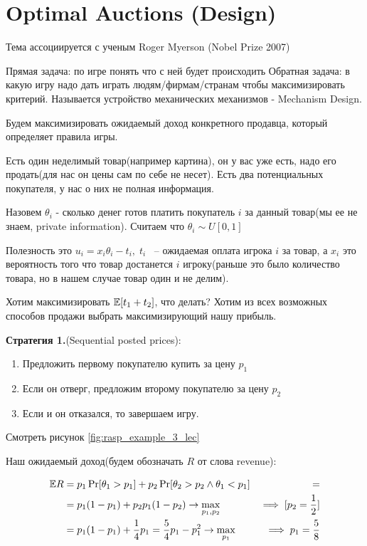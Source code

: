 
\section{Optimal Auctions (Design)}

Тема ассоциируется с ученым Roger Myerson (Nobel Prize 2007)

Прямая задача: по игре понять что с ней будет происходить
Обратная задача: в какую игру надо дать играть людям/фирмам/странам чтобы максимизировать критерий. Называется устройство механических механизмов - Mechanism Design.

Будем максимизировать ожидаемый доход конкретного продавца, который определяет правила игры.

\begin{exmpl}
	Есть один неделимый товар(например картина), он у вас уже есть, надо его продать(для нас он цены сам по себе не несет).
	Есть два потенциальных покупателя, у нас о них не полная информация.

	Назовем $\theta_i$ - сколько денег готов платить покупатель  $i$ за данный товар(мы ее не знаем, private information).
	Считаем что $\theta_i \sim U[0, 1]$

	Полезность это $u_i = x_i \theta_i - t_i, \; t_i$ ~-- ожидаемая оплата игрока $i$ за товар, а  $x_i$ это вероятность того что товар достанется  $i$ игроку(раньше это было количество товара, но в нашем случае товар один и не делим).

	Хотим максимизировать  $\mathbb E[t_1 + t_2]$, что делать? Хотим из всех возможных способов продажи выбрать максимизирующий нашу прибыль.

	\textbf{Стратегия 1.}(Sequential posted prices):
	\begin{enumerate}
		\item Предложить первому покупателю купить за цену $p_1$
		\item Если он отверг, предложим второму покупателю за цену $p_2$
		\item Если и он отказался, то завершаем игру.
	\end{enumerate}

	Смотреть рисунок \ref{fig:rasp_example_3_lec}

	Наш ожидаемый доход(будем обозначать $R$ от слова revenue):

	\begin{align*}
		\mathbb E R &= p_1 \Pr[\theta_1 > p_1] + p_2 \Pr[\theta_2 > p_2 \land \theta_1 < p_1] &= \\
			 &= p_1 (1 - p_1) + p_2 p_1 (1 - p_2) \to \max_{p_1, p_2} &\implies [p_2 = \frac{1}{2}]\\
			 &= p_1 (1 - p_1) + \frac{1}{4} p_1 = \frac{5}{4} p_1 - p_1^2 \to \max_{p_1} &\implies p_1 = \frac{5}{8}
	\end{align*}


\end{exmpl}
